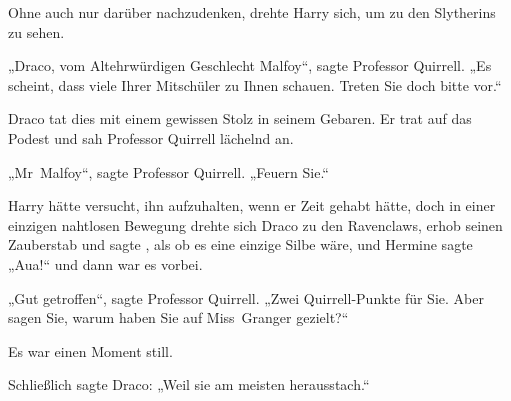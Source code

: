 Ohne auch nur darüber nachzudenken, drehte Harry sich, um zu den Slytherins zu sehen.

„Draco, vom Altehrwürdigen Geschlecht Malfoy“, sagte Professor Quirrell.
„Es scheint, dass viele Ihrer Mitschüler zu Ihnen schauen. Treten Sie doch bitte vor.“

Draco tat dies mit einem gewissen Stolz in seinem Gebaren. Er trat auf das Podest und sah Professor Quirrell lächelnd an.

„Mr~Malfoy“, sagte Professor Quirrell.
„Feuern Sie.“

Harry hätte versucht, ihn aufzuhalten, wenn er Zeit gehabt hätte, doch in einer einzigen nahtlosen Bewegung drehte sich Draco zu den Ravenclaws, erhob seinen Zauberstab und sagte , als ob es eine einzige Silbe wäre, und Hermine sagte
„Aua!“ und dann war es vorbei.

„Gut getroffen“, sagte Professor Quirrell.
„Zwei Quirrell-Punkte für Sie. Aber sagen Sie, warum haben Sie auf Miss~Granger gezielt?“

Es war einen Moment still.

Schließlich sagte Draco:
„Weil sie am meisten herausstach.“


